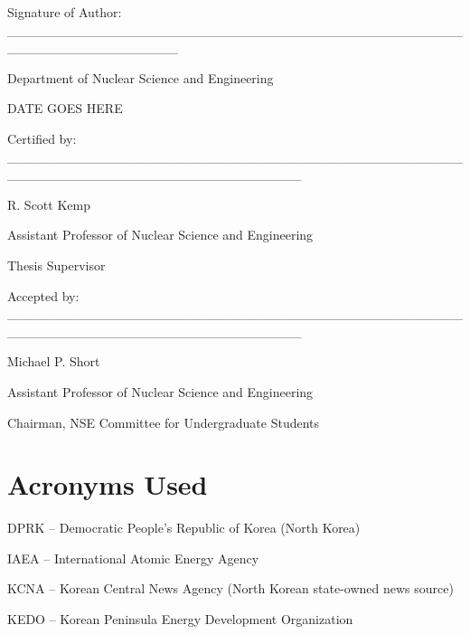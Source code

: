 \documentclass{article}
\begin{document}
\begin{titlepage}
    {Signature of Author: \_\_\_\_\_\_\_\_\_\_\_\_\_\_\_\_\_\_\_\_\_\_\_\_\_\_\_\_\_\_\_\_\_\_\_\_\_\_\_\_\_\_\_\_\_\_\_\_\_\_\_\_\_\_\_\_\_\_\_\_\_\_\_\_\_\_}
    \begin{flushright}
        Department of Nuclear Science and Engineering \par 
        DATE GOES HERE
    \end{flushright}
    \vspace{0.5 cm}
    {Certified by: \_\_\_\_\_\_\_\_\_\_\_\_\_\_\_\_\_\_\_\_\_\_\_\_\_\_\_\_\_\_\_\_\_\_\_\_\_\_\_\_\_\_\_\_\_\_\_\_\_\_\_\_\_\_\_\_\_\_\_\_\_\_\_\_\_\_\_\_\_\_\_\_\_\_\_\_\_\_\_}
    \begin{flushright}
        R. Scott Kemp \par
        Assistant Professor of Nuclear Science and Engineering \par
        Thesis Supervisor
    \end{flushright}
    \vspace{0.5 cm}
    {Accepted by: \_\_\_\_\_\_\_\_\_\_\_\_\_\_\_\_\_\_\_\_\_\_\_\_\_\_\_\_\_\_\_\_\_\_\_\_\_\_\_\_\_\_\_\_\_\_\_\_\_\_\_\_\_\_\_\_\_\_\_\_\_\_\_\_\_\_\_\_\_\_\_\_\_\_\_\_\_\_\_}
    \begin{flushright}
        Michael P. Short \par
        Assistant Professor of Nuclear Science and Engineering \par
        Chairman, NSE Committee for Undergraduate Students
    \end{flushright}
    
    
\end{titlepage}

\newpage
\thispagestyle{empty}
       \addtocounter{page}{-1}
       \null
\newpage

\tableofcontents

\pagebreak

\section{Acronyms Used}

DPRK – Democratic People’s Republic of Korea (North Korea)

\noindent IAEA – International Atomic Energy Agency

\noindent KCNA – Korean Central News Agency (North Korean state-owned news source)

\noindent KEDO – Korean Peninsula Energy Development Organization
\end{document}
